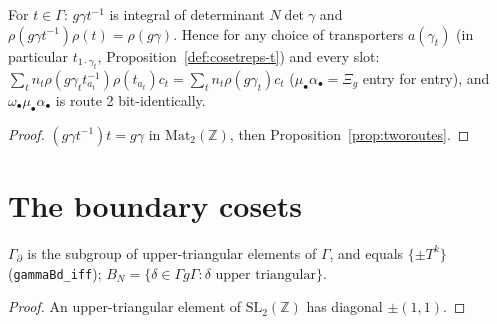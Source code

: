 \begin{proposition}[The middle cochain map $\mu_\bullet$: closed form and $\mu\alpha=\Xi_g$]\label{prop:mu}
  \leanok
  For $t\in\Gamma$: $g\gamma t^{-1}$ is integral of determinant $N\det\gamma$ and $\rho(g\gamma t^{-1})\rho(t)=\rho(g\gamma)$. Hence
  for any choice of transporters $a(\gamma_t)$ (in particular $t_{1\cdot\gamma_t}$, Proposition~\ref{def:cosetreps-t}) and every
  slot: $\sum_tn_t\rho(g\gamma_tt_{a_t}^{-1})\rho(t_{a_t})c_t=\sum_tn_t\rho(g\gamma_t)c_t$ ($\mu_\bullet\alpha_\bullet=\Xi_g$ entry for entry),
  and $\omega_\bullet\mu_\bullet\alpha_\bullet$ is route 2 bit-identically.
\end{proposition}
\begin{proof}
  \leanok
  $(g\gamma t^{-1})t=g\gamma$ in $\mathrm{Mat}_2(\mathbb Z)$, then Proposition~\ref{prop:tworoutes}.
\end{proof}

\section{The boundary cosets}

\begin{definition}\label{def:bdrycosets}
  \leanok
  $\Gamma_\partial$ is the subgroup of upper-triangular elements of $\Gamma$, and equals $\{\pm T^k\}$ (\texttt{gammaBd\_iff});
  $B_N=\{\delta\in\Gamma g\Gamma:\delta\text{ upper triangular}\}$.
\end{definition}
\begin{proof}
  \leanok
  An upper-triangular element of $\mathrm{SL}_2(\mathbb Z)$ has diagonal $\pm(1,1)$.
\end{proof}

